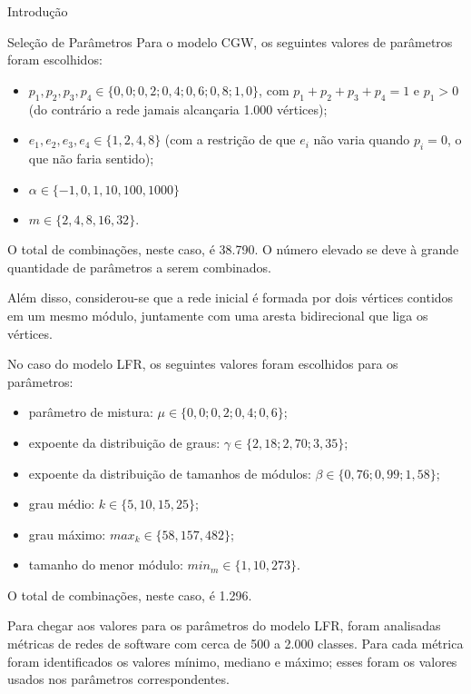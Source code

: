 \begin{section}{Introdução}
\begin{subsection}{Seleção de Parâmetros}
Para o modelo CGW, os seguintes valores de parâmetros foram escolhidos:

\begin{itemize}
	\item $p_1, p_2, p_3, p_4 \in \{0,0; 0,2; 0,4; 0,6; 0,8; 1,0\}$, com $p_1 + p_2 + p_3 + p_4 = 1$ e $p_1 > 0$ (do contrário a rede jamais alcançaria 1.000 vértices);
	\item $e_1, e_2, e_3, e_4 \in \{1, 2, 4, 8\}$ (com a restrição de que $e_i$ não varia quando $p_i = 0$, o que não faria sentido);
	\item $\alpha \in \{-1, 0, 1, 10, 100, 1000\}$
	\item $m \in \{2, 4, 8, 16, 32\}$.
\end{itemize}

O total de combinações, neste caso, é 38.790. O número elevado se deve à grande quantidade de parâmetros a serem combinados.

Além disso, considerou-se que a rede inicial é formada por dois vértices contidos em um mesmo módulo, juntamente com uma aresta bidirecional que liga os vértices.

No caso do modelo LFR, os seguintes valores foram escolhidos para os parâmetros:

\begin{itemize}
	\item parâmetro de mistura: $\mu \in \{0,0; 0,2; 0,4; 0,6\}$;
	\item expoente da distribuição de graus: $\gamma \in \{2,18; 2,70; 3,35\}$;
	\item expoente da distribuição de tamanhos de módulos: $\beta \in \{0,76; 0,99; 1,58\}$;
	\item grau médio: $k \in \{5, 10, 15, 25\}$;
	\item grau máximo: $max_k \in \{58, 157, 482\}$;
	\item tamanho do menor módulo: $min_m \in \{1, 10, 273\}$.
\end{itemize}

O total de combinações, neste caso, é 1.296.

Para chegar aos valores para os parâmetros do modelo LFR, foram analisadas métricas de redes de software com cerca de 500 a 2.000 classes. Para cada métrica foram identificados os valores mínimo, mediano e máximo; esses foram os valores usados nos parâmetros correspondentes.



\end{subsection}
\end{section}

